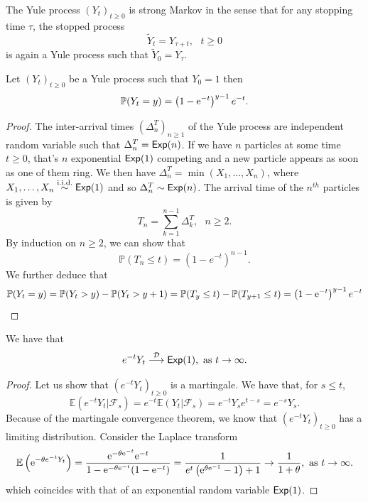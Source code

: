 \begin{remark}\label{rem:stopped_yule_process}
The Yule process $(Y_t)_{t\geq0}$ is strong Markov in the sense that for any stopping time $\tau$, the stopped process 
$$
\tilde{Y}_t = Y_{\tau+t},\text{ }t\geq0
$$
is again a Yule process such that $\tilde{Y}_0 = Y_\tau$.
\end{remark}
\begin{prop}\label{prop:yule_process_dist}
Let $(Y_t)_{t\geq0}$ be a Yule process such that $Y_0 = 1$ then 
$$
\mathbb{P}(Y_t = y) = \left(1-\mathrm{e}^{-t}\right)^{y-1}e^{-t}.
$$

\end{prop}
\begin{proof}
The inter-arrival times $(\Delta^T_n)_{n\geq1}$ of the Yule process are independent random variable such that $\Delta^T_n = \mathsf{Exp}(n)$. If we have $n$ particles at some time $t\geq0$, that's $n$ exponential $\mathsf{Exp}(1)$ competing and a new particle appears as soon as one of them ring. We then have $\Delta^T_n = \min(X_1,\ldots, X_{n})$, where $X_1,\ldots, X_n \overset{\text{i.i.d.}}{\sim}\mathsf{Exp}(1)$ and so $\Delta^T_n \sim \mathsf{Exp}(n)$. The arrival time of the $n^{th}$ particles is given by   
$$
T_n = \sum_{k =1}^{n-1}\Delta^T_k,\text{ }n\geq2.
$$
By induction on $n\geq2$, we can show that 
\[
\mathbb{P}(T_n\leq t) = \left(1-e^{-t}\right)^{n-1}.
\]
We further deduce that 
\[
\mathbb{P}(Y_t = y) = \mathbb{P}(Y_t > y) - \mathbb{P}(Y_t > y+1) = \mathbb{P}(T_{y} \leq t) - \mathbb{P}(T_{y+1} \leq t)=\left(1-\mathrm{e}^{-t}\right)^{y-1}e^{-t}   
\]
\end{proof}
\begin{theo}\label{theo:convergence_yule_process}
We have that 
\[
e^{-t}Y_t\overset{\mathcal{D}}{\longrightarrow}\mathsf{Exp}(1),\text{ as }t\rightarrow \infty.
\]
\end{theo}
\begin{proof}
Let us show that $\left(e^{-t}Y_t\right)_{t\geq0}$ is a martingale. We have that, for $s\leq t$, 
\[
\mathbb{E}(e^{-t}Y_t|\mathcal{F}_s) = e^{-t}\mathbb{E}(Y_t|\mathcal{F}_s) = e^{-t}Y_se^{t-s} = e^{-s}Y_s.
\]
Because of the martingale convergence theorem, we know that $\left(e^{-t}Y_t\right)_{t\geq0}$ has a limiting distribution. Consider the Laplace transform 
\[
\mathbb{E}\left(\mathrm{e}^{-\theta e^{-t}Y_t}\right) = \frac{\mathrm{e}^{-\theta \mathrm{e}^{-t}}\mathrm{e}^{-t} }{1-\mathrm{e}^{-\theta \mathrm{e}^{-t}}(1-\mathrm{e}^{-t})}=\frac{1}{e^t\left(\mathrm{e}^{\theta\mathrm{e}^{-1}}-1\right)+1}\rightarrow\frac{1}{1+\theta},\text{ as }t\rightarrow\infty.
\]
which coincides with that of an exponential random variable $\mathsf{Exp}(1)$.

\end{proof}
